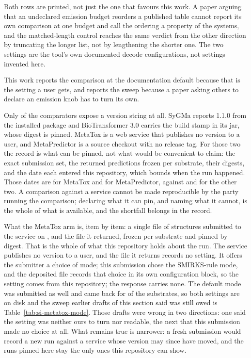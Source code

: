 \documentclass[journal=jcisd8,manuscript=suppinfo,layout=onecolumn]{achemso}
\begin{document}
Both rows are printed, not just the one that favours this work. A paper arguing that an
undeclared emission budget reorders a published table cannot report its own comparison at one
budget and call the ordering a property of the systems, and the matched-length control reaches the
same verdict from the other direction by truncating the longer list, not by lengthening the
shorter one. The two settings are the tool's own documented decode configurations, not settings
invented here.

This work reports the comparison at the documentation default because that is the setting a user
gets, and reports the sweep because a paper asking others to declare an emission knob has to turn
its own.

Only \numComparatorsVersionedWord{} of the \numComparatorsNWord{} comparators expose a version
string at all. SyGMa reports 1.1.0 from the installed package and BioTransformer 3.0 carries the
build stamp \numComparatorsBiotransformerBuild{} in its jar, whose digest is pinned. MetaTox is a
web service that publishes
no version to a user, and MetaPredictor is a source checkout with no release tag. For those two
the record is what can be pinned, not what would be convenient to claim: the exact
submission set, the returned predictions frozen per substrate, their digests, and the date each
entered this repository, which bounds when the run happened. Those dates are
\numComparatorsMetatoxDate{} for MetaTox and \numComparatorsMetapredictorDate{} for
MetaPredictor, against \numComparatorsSygmaDate{} and \numComparatorsBiotransformerDate{} for the
other two. A comparison against a service cannot be made reproducible by the party running the
comparison; declaring what it can pin, and naming what it cannot, is the whole of what is
available, and the shortfall belongs in the record.

What the MetaTox arm is, item by item: a single file of \numPopulationN{} structures submitted to
the service on \numComparatorsMetatoxDate{}, and the file it returned, frozen per substrate and
pinned by digest. That is the whole of what this repository holds about the run. The service
publishes no version to a user, and the file it returns records no setting. It offers the submitter
a choice of mode; this submission chose the SMIRKS-rule mode, and the deposited file records that
choice in its own configuration block, so the setting comes from this repository; the response
carries none. The default mode was submitted as well and came back for \numMtmodeN{} of
the \numMtmodeDeclared{} substrates, so both settings are on disk and the sweep earlier drafts of
this section said was still owed is Table~\ref{tab:si-metatox-mode}. Those drafts were
wrong in two directions: one said the setting was neither ours to turn nor readable, the next that
this submission made no choice at all. What remains true is narrower: a fresh submission would
record a new run against a service whose version may since have moved, and the runs pinned here
stay the only ones this repository can show.
\end{document}
